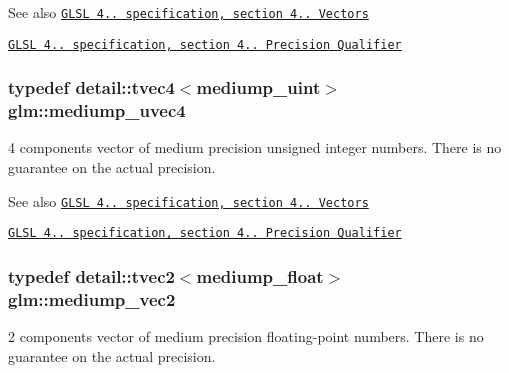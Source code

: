 \begin{DoxySeeAlso}{\-See also}
\href{http://www.opengl.org/registry/doc/GLSLangSpec.4.20.8.pdf}{\tt \-G\-L\-S\-L 4.. specification, section 4.. \-Vectors} 

\href{http://www.opengl.org/registry/doc/GLSLangSpec.4.20.8.pdf}{\tt \-G\-L\-S\-L 4.. specification, section 4.. \-Precision \-Qualifier} 
\end{DoxySeeAlso}
\hypertarget{group__core__precision_ga50b1bc4e07de623f15ec5a319c85609f}{
\subsubsection[{mediump\-\_\-uvec4}]{\setlength{\rightskip}{0pt plus 5cm}typedef detail\-::tvec4$<$mediump\-\_\-uint$>$ {\bf glm\-::mediump\-\_\-uvec4}}}\label{group__core__precision_ga50b1bc4e07de623f15ec5a319c85609f}
4 components vector of medium precision unsigned integer numbers. \-There is no guarantee on the actual precision.

\begin{DoxySeeAlso}{\-See also}
\href{http://www.opengl.org/registry/doc/GLSLangSpec.4.20.8.pdf}{\tt \-G\-L\-S\-L 4.. specification, section 4.. \-Vectors} 

\href{http://www.opengl.org/registry/doc/GLSLangSpec.4.20.8.pdf}{\tt \-G\-L\-S\-L 4.. specification, section 4.. \-Precision \-Qualifier} 
\end{DoxySeeAlso}
\hypertarget{group__core__precision_gaa19e624188c7908ba28b9ef829e076f2}{
\subsubsection[{mediump\-\_\-vec2}]{\setlength{\rightskip}{0pt plus 5cm}typedef detail\-::tvec2$<$mediump\-\_\-float$>$ {\bf glm\-::mediump\-\_\-vec2}}}\label{group__core__precision_gaa19e624188c7908ba28b9ef829e076f2}
2 components vector of medium precision floating-\/point numbers. \-There is no guarantee on the actual precision.

